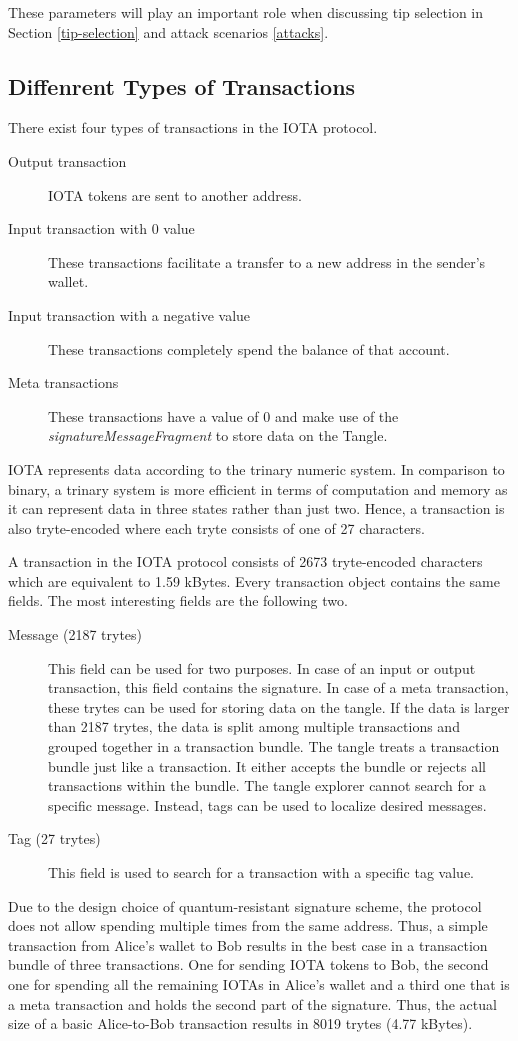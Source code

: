 These parameters will play an important role when discussing tip selection in Section \ref{tip-selection} and attack scenarios \ref{attacks}.

\subsection{Diffenrent Types of Transactions}\label{different-types-of-transactions}
There exist four types of transactions in the IOTA protocol.
\begin{description}
    \item[Output transaction] IOTA tokens are sent to another address.
    \item[Input transaction with 0 value] These transactions facilitate a transfer to a new address in the sender's wallet.
    \item[Input transaction with a negative value] These transactions completely spend the balance of that account.
    \item[Meta transactions] These transactions have a value of 0 and make use of the \textit{signatureMessageFragment} to store data on the Tangle. 
\end{description}

IOTA represents data according to the trinary numeric system. In comparison to binary, a trinary system is more efficient in terms of computation and memory as it can represent data in three states rather than just two. Hence, a transaction is also tryte-encoded where each tryte consists of one of 27 characters.

A transaction in the IOTA protocol consists of 2673 tryte-encoded characters which are equivalent to 1.59 kBytes. Every transaction object contains the same fields. The most interesting fields are the following two.
\begin{description}
    \item[Message (2187 trytes)] This field can be used for two purposes. In case of an input or output transaction, this field contains the signature. In case of a meta transaction, these trytes can be used for storing data on the tangle. If the data is larger than 2187 trytes, the data is split among multiple transactions and grouped together in a transaction bundle. The tangle treats a transaction bundle just like a transaction. It either accepts the bundle or rejects all transactions within the bundle. The tangle explorer cannot search for a specific message. Instead, tags can be used to localize desired messages.
    \item[Tag (27 trytes)] This field is used to search for a transaction with a specific tag value.
\end{description}

Due to the design choice of quantum-resistant signature scheme, the protocol does not allow spending multiple times from the same address. Thus, a simple transaction from Alice's wallet to Bob results in the best case in a transaction bundle of three transactions. One for sending IOTA tokens to Bob, the second one for spending all the remaining IOTAs in Alice's wallet and a third one that is a meta transaction and holds the second part of the signature. Thus, the actual size of a basic Alice-to-Bob transaction results in 8019 trytes (4.77 kBytes).